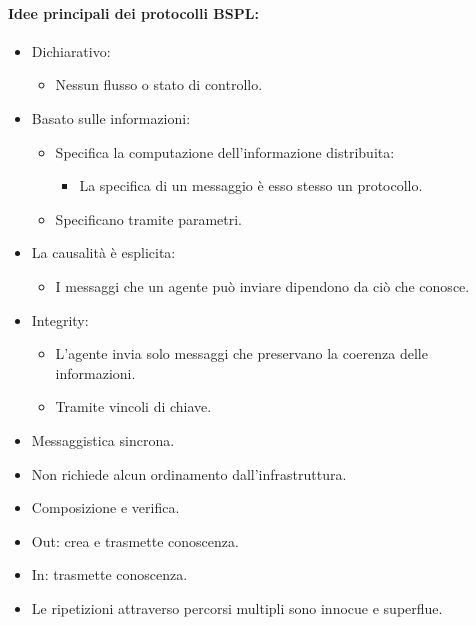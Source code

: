 \paragraph{Idee principali dei protocolli BSPL:}
\begin{itemize}
  \item Dichiarativo: 
    \begin{itemize}
      \item Nessun flusso o stato di controllo.
    \end{itemize}
  \item Basato sulle informazioni: 
    \begin{itemize}
      \item Specifica la computazione dell'informazione distribuita: 
        \begin{itemize}
          \item La specifica di un messaggio è esso stesso un protocollo.
        \end{itemize}
      \item Specificano tramite parametri. 
    \end{itemize}
  \item La causalità è esplicita:
    \begin{itemize}
      \item I messaggi che un agente può inviare dipendono da ciò che conosce.
    \end{itemize}
  \item Integrity: 
    \begin{itemize}
      \item L'agente invia solo messaggi che preservano la coerenza delle informazioni. 
      \item Tramite vincoli di chiave.
    \end{itemize}
  \item Messaggistica sincrona. 
  \item Non richiede alcun ordinamento dall'infrastruttura. 
  \item Composizione e verifica.
  
\end{itemize}


\begin{itemize}
  \item Out: crea e trasmette conoscenza. 
  \item In: trasmette conoscenza. 
  \item Le ripetizioni attraverso percorsi multipli sono innocue e superflue.
\end{itemize}


